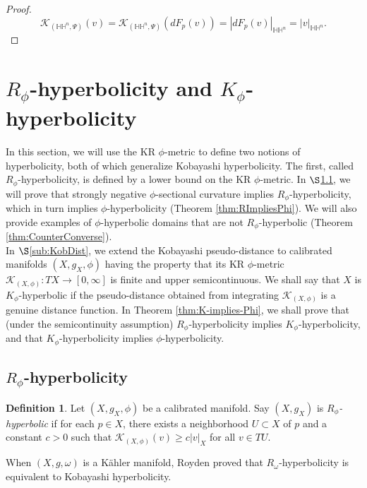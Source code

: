 \documentclass[11pt]{article}
\theoremstyle{definition}
\newtheorem{defn}[thm]{Definition}
\numberwithin{equation}{section}
\begin{document}
\begin{proof}
$$\mathcal{K}_{(\mathbb{HH}^n, \Psi)}(v) = \mathcal{K}_{(\mathbb{HH}^n, \Psi)}(dF_p(v)) = \left| dF_p(v) \right|_{\mathbb{HH}^n} = |v|_{\mathbb{HH}^n}.$$
\end{proof}

\section{$R_\phi$-hyperbolicity and $K_\phi$-hyperbolicity} \label{sec:RphiKphi}

\indent \indent In this section, we will use the KR $\phi$-metric to define two notions of hyperbolicity, both of which generalize Kobayashi hyperbolicity.  The first, called $R_\phi$-hyperbolicity, is defined by a lower bound on the KR $\phi$-metric.  In $\S$\ref{sub:Rphi}, we will prove that strongly negative $\phi$-sectional curvature implies $R_\phi$-hyperbolicity, which in turn implies $\phi$-hyperbolicity (Theorem \ref{thm:RImpliesPhi}).  We will also provide examples of $\phi$-hyperbolic domains that are not $R_\phi$-hyperbolic (Theorem \ref{thm:CounterConverse}). \\
\indent In $\S$\ref{sub:KobDist}, we extend the Kobayashi pseudo-distance to calibrated manifolds $(X, g_X, \phi)$ having the property that its KR $\phi$-metric $\mathcal{K}_{(X,\phi)} \colon TX \to [0,\infty]$ is finite and upper semicontinuous.  We shall say that $X$ is $K_\phi$-hyperbolic if the pseudo-distance obtained from integrating $\mathcal{K}_{(X,\phi)}$ is a genuine distance function.  In Theorem \ref{thm:K-implies-Phi}, we shall prove that (under the semicontinuity assumption) $R_\phi$-hyperbolicity implies $K_\phi$-hyperbolicity, and that $K_\phi$-hyperbolicity implies $\phi$-hyperbolicity.

\subsection{$R_\phi$-hyperbolicity} \label{sub:Rphi}

\begin{defn} Let $(X, g_X, \phi)$ be a calibrated manifold.  Say $(X, g_X)$ is \emph{$R_\phi$-hyperbolic} if for each $p \in X$, there exists a neighborhood $U \subset X$ of $p$ and a constant $c > 0$ such that $\mathcal{K}_{(X,\phi)}(v) \geq c \left|v\right|_X$ for all $v \in TU$.
\end{defn}

\indent When $(X, g, \omega)$ is a K\"{a}hler manifold, Royden \cite{royden2006remarks} proved that $R_\omega$-hyperbolicity is equivalent to Kobayashi hyperbolicity.
\end{document}
